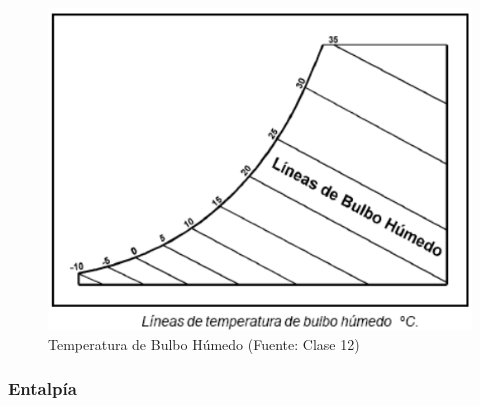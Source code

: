         \begin{multicols}{2}
            \begin{quote}
            \end{quote}
            
            \begin{figure}
                \includegraphics[width=\textwidth]{img/clases/temperatura_bulbo_humedo.png}
                \caption{Temperatura de Bulbo Húmedo (Fuente: Clase 12)}
                \label{fig:temperatura_bulbo_humedo}
            \end{figure}
        \end{multicols}
        \newpage
        
        \subsubsection{Entalpía}
        
